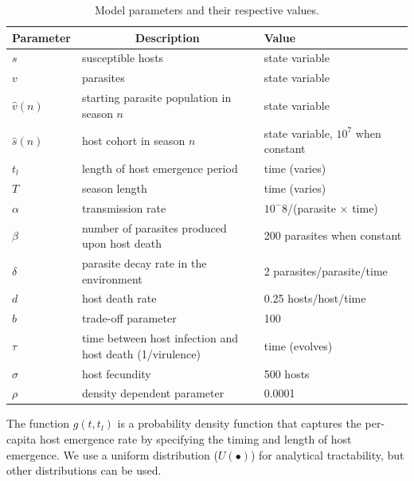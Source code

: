 \documentclass{article}
\begin{document}
\begin{table}
\begin{tabular}{ |p{0.5cm} p{9.5cm} p{5cm}| }
 \hline
\textbf{Parameter} & \multicolumn{1}{c}{\textbf{Description}} & {\textbf{Value}} \\
 \hline
 $s$ & susceptible hosts & state variable\\

 $v$ & parasites & state variable\\

 $\hat{v}(n)$ & starting parasite population in season $n$ & state variable\\
 
 $\hat{s}(n)$ & host cohort in season $n$ & state variable, $10^7$ when constant\\

 $t_{l}$ & length of host emergence period & time (varies)\\

 $T$ & season length & time (varies)\\

 $\alpha$ & transmission rate & $10^-8$/(parasite $\times$ time)\\

 $\beta$ & number of parasites produced upon host death & 200 parasites when constant\\

 $\delta$ & parasite decay rate in the environment  & 2 parasites/parasite/time\\

 $d$ & host death rate & 0.25 hosts/host/time\\
 
 $b$ & trade-off parameter & 100\\

 $\tau$ & time between host infection and host death (1/virulence) & time (evolves)\\
 
 $\sigma$ & host fecundity & 500 hosts\\
 
 $\rho$ & density dependent parameter & 0.0001\\
 \hline
\end{tabular}
\caption{Model parameters and their respective values.}
\end{table}

\noindent The function $g(t,t_{l})$ is a probability density function that captures the per-capita host emergence rate by specifying the timing and length of host emergence. We use a uniform distribution ($U(\bullet)$) for analytical tractability, but other distributions can be used.
\end{document}
